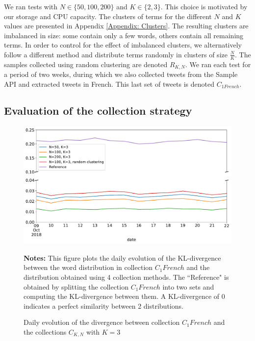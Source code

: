  We ran tests with $N \in \{50, 100, 200\}$ and $K \in \{2,3\}$. This choice is motivated by our storage and CPU capacity. The clusters of terms for the different $N$ and $K$ values are presented in Appendix \ref{Appendix: Clusters}. The resulting clusters are imbalanced in size: some contain only a few words, others contain all remaining terms. In order to control for the effect of imbalanced clusters, we alternatively follow a different method and distribute terms randomly in clusters of size $\frac{N}{K}$. The samples collected using random clustering are denoted $R_{K,N}$. We ran each test for a period of two weeks, during which we also collected tweets from the Sample API and extracted tweets in French. This last set of tweets is denoted $C_{1 French}$.
			
			\subsection{Evaluation of the collection strategy \label{SubSec: evaluation_of_collection}}
			
\begin{figure}
\begin{center}
\includegraphics[scale=.5]{figures/KL_K=3.pdf}
\end{center}
{\scriptsize \textbf{Notes:} This figure plots the daily evolution of the KL-divergence between the word distribution in collection $C_1 French$ and the distribution obtained using 4 collection methods. The ``Reference" is obtained by splitting the collection $C_1 French$ into two sets and computing the KL-divergence between them. A KL-divergence of 0 indicates a perfect similarity between 2 distributions.}
\caption{Daily evolution of the divergence between collection $C_1 French$ and the collections $C_{K,N}$ with $K = 3$}
\label{Figure:KL_K=3}
\end{figure}

